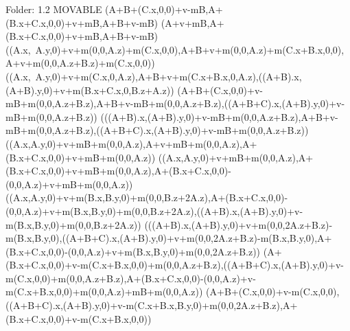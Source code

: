 Folder: 1.2 MOVABLE
\left(A+B+\left(C.x,0,0\right)+v-mB,A+\left(B.x+C.x,0,0\right)+v+mB,A+B+v-mB\right)
\left(A+v+mB,A+\left(B.x+C.x,0,0\right)+v+mB,A+B+v-mB\right)
\left(\left(A.x,\ A.y,0\right)+v+m\left(0,0,A.z\right)+m\left(C.x,0,0\right),A+B+v+m\left(0,0,A.z\right)+m\left(C.x+B.x,0,0\right),\ A+v+m\left(0,0,A.z+B.z\right)+m\left(C.x,0,0\right)\right)
\left(\left(A.x,\ A.y,0\right)+v+m\left(C.x,0,A.z\right),A+B+v+m\left(C.x+B.x,0,A.z\right),\left(\left(A+B\right).x,\left(A+B\right).y,0\right)+v+m\left(B.x+C.x,0,B.z+A.z\right)\right)
\left(A+B+\left(C.x,0,0\right)+v-mB+m\left(0,0,A.z+B.z\right),A+B+v-mB+m\left(0,0,A.z+B.z\right),\left(\left(A+B+C\right).x,\left(A+B\right).y,0\right)+v-mB+m\left(0,0,A.z+B.z\right)\right)
\left(\left(\left(A+B\right).x,\left(A+B\right).y,0\right)+v-mB+m\left(0,0,A.z+B.z\right),A+B+v-mB+m\left(0,0,A.z+B.z\right),\left(\left(A+B+C\right).x,\left(A+B\right).y,0\right)+v-mB+m\left(0,0,A.z+B.z\right)\right)
\left(\left(A.x,A.y,0\right)+v+mB+m\left(0,0,A.z\right),A+v+mB+m\left(0,0,A.z\right),A+\left(B.x+C.x,0,0\right)+v+mB+m\left(0,0,A.z\right)\right)
\left(\left(A.x,A.y,0\right)+v+mB+m\left(0,0,A.z\right),A+\left(B.x+C.x,0,0\right)+v+mB+m\left(0,0,A.z\right),A+\left(B.x+C.x,0,0\right)-\left(0,0,A.z\right)+v+mB+m\left(0,0,A.z\right)\right)
\left(\left(A.x,A.y,0\right)+v+m\left(B.x,B.y,0\right)+m\left(0,0,B.z+2A.z\right),A+\left(B.x+C.x,0,0\right)-\left(0,0,A.z\right)+v+m\left(B.x,B.y,0\right)+m\left(0,0,B.z+2A.z\right),\left(\left(A+B\right).x,\left(A+B\right).y,0\right)+v-m\left(B.x,B.y,0\right)+m\left(0,0,B.z+2A.z\right)\right)
\left(\left(\left(A+B\right).x,\left(A+B\right).y,0\right)+v+m\left(0,0,2A.z+B.z\right)-m\left(B.x,B.y,0\right),\left(\left(A+B+C\right).x,\left(A+B\right).y,0\right)+v+m\left(0,0,2A.z+B.z\right)-m\left(B.x,B.y,0\right),A+\left(B.x+C.x,0,0\right)-\left(0,0,A.z\right)+v+m\left(B.x,B.y,0\right)+m\left(0,0,2A.z+B.z\right)\right)
\left(A+\left(B.x+C.x,0,0\right)+v-m\left(C.x+B.x,0,0\right)+m\left(0,0,A.z+B.z\right),\left(\left(A+B+C\right).x,\left(A+B\right).y,0\right)+v-m\left(C.x,0,0\right)+m\left(0,0,A.z+B.z\right),A+\left(B.x+C.x,0,0\right)-\left(0,0,A.z\right)+v-m\left(C.x+B.x,0,0\right)+m\left(0,0,A.z\right)+mB+m\left(0,0,A.z\right)\right)
\left(A+B+\left(C.x,0,0\right)+v-m\left(C.x,0,0\right),\left(\left(A+B+C\right).x,\left(A+B\right).y,0\right)+v-m\left(C.x+B.x,B.y,0\right)+m\left(0,0,2A.z+B.z\right),A+\left(B.x+C.x,0,0\right)+v-m\left(C.x+B.x,0,0\right)\right)

